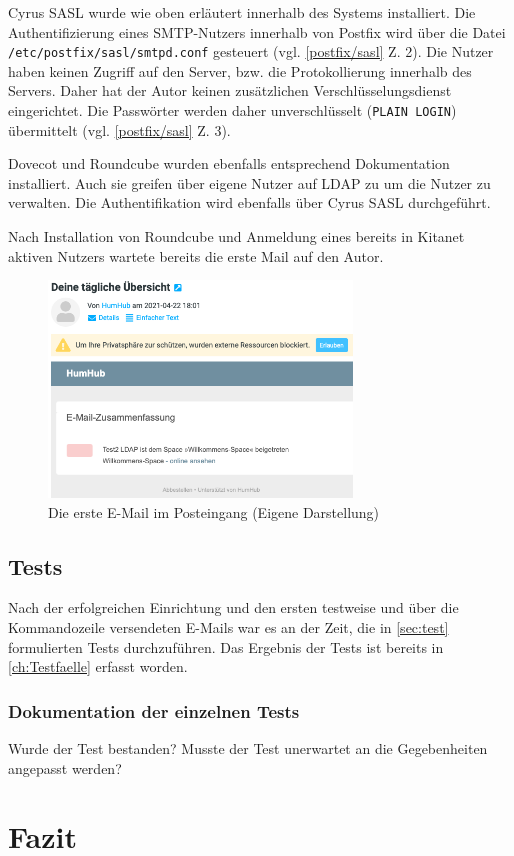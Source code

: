 Cyrus SASL wurde wie oben erläutert innerhalb des Systems installiert. 
Die Authentifizierung eines SMTP-Nutzers innerhalb von Postfix wird über die Datei\\\verb+/etc/postfix/sasl/smtpd.conf+ gesteuert (vgl. \autoref{postfix/sasl} Z. 2). 
Die Nutzer haben keinen Zugriff auf den Server, bzw. die Protokollierung innerhalb des Servers.
Daher hat der Autor keinen zusätzlichen Verschlüsselungsdienst eingerichtet. 
Die Passwörter werden daher unverschlüsselt (\verb+PLAIN LOGIN+) übermittelt (vgl. \autoref{postfix/sasl} Z. 3). 

Dovecot und Roundcube wurden ebenfalls entsprechend Dokumentation installiert. Auch sie greifen über eigene Nutzer auf LDAP zu um die Nutzer zu verwalten. Die Authentifikation wird ebenfalls über Cyrus SASL durchgeführt.

Nach Installation von Roundcube und Anmeldung eines bereits in Kitanet aktiven Nutzers wartete bereits die erste Mail auf den Autor.

\begin{figure}[H]
  \centering
  \includegraphics[width=0.72\textwidth]{res/erste Mail.png}
  \caption{Die erste E-Mail im Posteingang (Eigene Darstellung)}
  \label{fig:Mail}
\end{figure}

\section{Tests}{}
Nach der erfolgreichen Einrichtung und den ersten testweise und über die Kommandozeile versendeten E-Mails war es an der Zeit, die in \autoref{sec:test} formulierten Tests durchzuführen. Das Ergebnis der Tests ist bereits in \autoref{ch:Testfaelle} erfasst worden.
\subsection{Dokumentation der einzelnen Tests}
Wurde der Test bestanden? Musste der Test unerwartet an die Gegebenheiten angepasst werden?

\chapter{Fazit}
\label{sec:Fazit}

\blindtext


